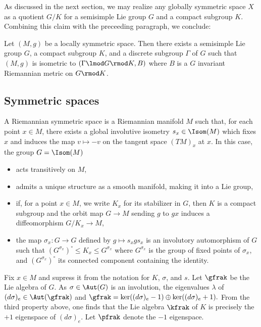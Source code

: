 As discussed in the next section,  we may realize any globally symmetric space $X$ as a quotient $G/K$ for a semisimple Lie group $G$ and a compact subgroup $K$.
Combining this claim with the preceeding paragraph, we conclude:
\begin{thm}
    Let $(M,g)$ be a locally symmetric space. Then there exists a semisimple Lie group $G$, a compact subgroup $K$, and a discrete subgroup $\Gamma$ of $G$ such that $(M,g)$ is isometric to $(\Gamma \lmod G \rmod K , B)$ where $B$ is a  $G$ invariant Riemannian metric on $G\rmod K$.
\end{thm}



\subsection{Symmetric spaces}

A Riemannian symmetric space is a Riemannian manifold $M$ such that, for each point $x\in M$, there exists a global involutive isometry $s_x \in \Isom(M)$ which fixes $x$ and induces the map $v \mapsto -v$ on the tangent space $(TM)_x$ at $x$. In this case, the group $G=\Isom(M)$
\begin{itemize}
    \item acts transitively on $M$,
    \item admits a unique structure as a smooth manifold, making it into a Lie group,
    \item if, for a point $x \in M$, we write $K_x$ for its stabilizer in $G$, then $K$ is a compact subgroup and the orbit map $G \to M$ sending $g$ to $gx$ induces a diffeomorphism $G/K_x \to M$,
    \item the map $\sigma_x: G \to G$ defined by $g \mapsto s_x g s_x$ is an involutory automorphism of $G$ such that $(G^{\sigma_x})^\circ \leq K_x \leq G^{\sigma_x}$ where $G^{\sigma_x}$ is the group of fixed points of $\sigma_x$, and $(G^{\sigma_x})^\circ$ its connected component containing the identity.
\end{itemize}
Fix $x \in M$ and supress it from the notation for $K$, $\sigma$, and $s$. Let $\gfrak$ be the Lie algebra of $G$. As $\sigma \in \Aut(G)$ is an involution, the eigenvalues $\lambda$ of $(d\sigma)_e \in \Aut(\gfrak)$ and $\gfrak = \ker ((d\sigma)_e-1)\oplus \ker ((d\sigma)_e+1).$  From the third property above, one finds that the Lie algebra $\kfrak$ of $K$ is precisely the $+1$ eigenspace of $(d \sigma)_e$. Let $\pfrak$ denote the $-1$ eigenspace.

